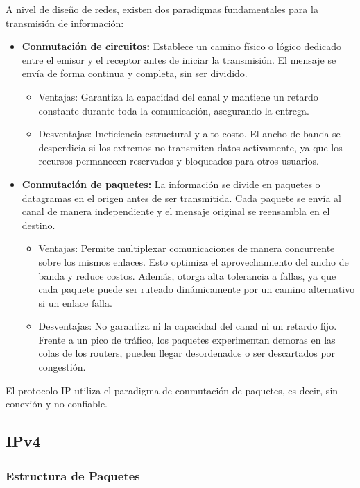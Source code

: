 \begin{obs}
  A nivel de diseño de redes, existen dos paradigmas fundamentales para la transmisión de información:
  \begin{itemize}
    \item \textbf{Conmutación de circuitos:} Establece un camino físico o lógico dedicado entre el emisor y el receptor antes de iniciar la transmisión. El mensaje se envía de forma continua y completa, sin ser dividido.
    \begin{itemize}
        \item Ventajas: Garantiza la capacidad del canal y mantiene un retardo constante durante toda la comunicación, asegurando la entrega.
        \item Desventajas: Ineficiencia estructural y alto costo. El ancho de banda se desperdicia si los extremos no transmiten datos activamente, ya que los recursos permanecen reservados y bloqueados para otros usuarios.
    \end{itemize}
    \item \textbf{Conmutación de paquetes:} La información se divide en paquetes o datagramas en el origen antes de ser transmitida. Cada paquete se envía al canal de manera independiente y el mensaje original se reensambla en el destino.
    \begin{itemize}
        \item Ventajas: Permite multiplexar comunicaciones de manera concurrente sobre los mismos enlaces. Esto optimiza el aprovechamiento del ancho de banda y reduce costos. Además, otorga alta tolerancia a fallas, ya que cada paquete puede ser ruteado dinámicamente por un camino alternativo si un enlace falla.
        \item Desventajas: No garantiza ni la capacidad del canal ni un retardo fijo. Frente a un pico de tráfico, los paquetes experimentan demoras en las colas de los routers, pueden llegar desordenados o ser descartados por congestión.
    \end{itemize}
  \end{itemize}
\end{obs}

El protocolo IP utiliza el paradigma de conmutación de paquetes, es decir, sin conexión y no confiable.

\subsection{IPv4}

\subsubsection{Estructura de Paquetes}

